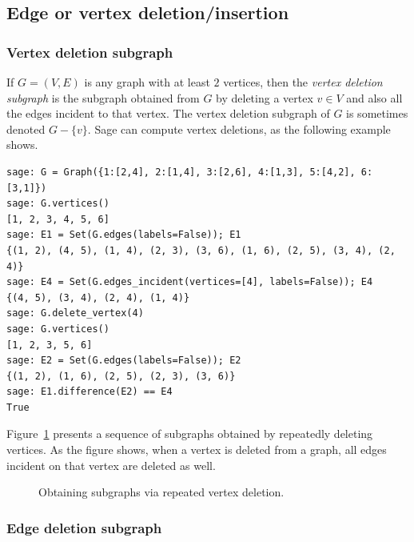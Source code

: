 
\subsection{Edge or vertex deletion/insertion}



\subsubsection{Vertex deletion subgraph}

If $G = (V,E)$ is any graph with at least $2$ vertices, then the
\emph{vertex deletion subgraph} is the subgraph obtained from $G$ by
deleting a vertex $v \in V$ and also all the edges incident to that
vertex. The vertex deletion subgraph of $G$ is sometimes denoted
$G - \{v\}$.
Sage can compute vertex deletions, as the following example shows.
%
\begin{lstlisting}
sage: G = Graph({1:[2,4], 2:[1,4], 3:[2,6], 4:[1,3], 5:[4,2], 6:[3,1]})
sage: G.vertices()
[1, 2, 3, 4, 5, 6]
sage: E1 = Set(G.edges(labels=False)); E1
{(1, 2), (4, 5), (1, 4), (2, 3), (3, 6), (1, 6), (2, 5), (3, 4), (2, 4)}
sage: E4 = Set(G.edges_incident(vertices=[4], labels=False)); E4
{(4, 5), (3, 4), (2, 4), (1, 4)}
sage: G.delete_vertex(4)
sage: G.vertices()
[1, 2, 3, 5, 6]
sage: E2 = Set(G.edges(labels=False)); E2
{(1, 2), (1, 6), (2, 5), (2, 3), (3, 6)}
sage: E1.difference(E2) == E4
True
\end{lstlisting}
%
Figure~\ref{fig:introduction:vertex_deletion_subgraphs}
presents a sequence of subgraphs obtained by repeatedly deleting
vertices. As the figure shows, when a vertex is deleted from a graph,
all edges incident on that vertex are deleted as well.

\begin{figure}[!htbp]
\centering

\caption{Obtaining subgraphs via repeated vertex deletion.}
\label{fig:introduction:vertex_deletion_subgraphs}
\end{figure}



\subsubsection{Edge deletion subgraph}

